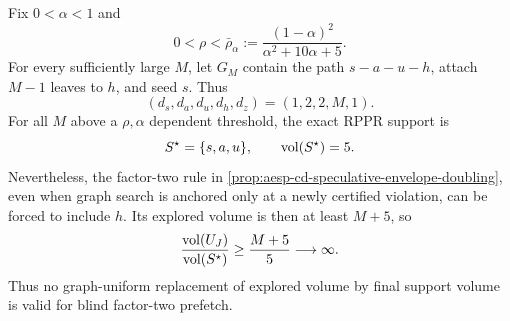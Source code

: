 \begin{proposition}
\label{prop:aesp-cd-rppr-speculative-decoy}
Fix $0<\alpha<1$ and
\begin{equation*}
 0<\rho<\bar\rho_\alpha
 :=\frac{(1-\alpha)^2}{\alpha^2+10\alpha+5}.
\end{equation*}
For every sufficiently large $M$, let $G_M$ contain the path
$s-a-u-h$, attach $M-1$ leaves to $h$, and seed $s$.  Thus
\begin{equation*}
 (d_s,d_a,d_u,d_h,d_z)=(1,2,2,M,1).
\end{equation*}
For all $M$ above a $\rho,\alpha$ dependent threshold, the exact RPPR support
is
\begin{equation*}
 S^\star=\{s,a,u\},\qquad \operatorname{vol}(S^\star)=5.
\end{equation*}
Nevertheless, the factor-two rule in
\cref{prop:aesp-cd-speculative-envelope-doubling}, even when graph search is
anchored only at a newly certified violation, can be forced to include $h$.
Its explored volume is then at least $M+5$, so
\begin{equation}
 \frac{\operatorname{vol}(U_J)}{\operatorname{vol}(S^\star)}\geq\frac{M+5}{5}\longrightarrow\infty.
 \label{eq:aesp-cd-rppr-speculative-decoy}
\end{equation}
Thus no graph-uniform replacement of explored volume by final support volume
is valid for blind factor-two prefetch.
\end{proposition}

